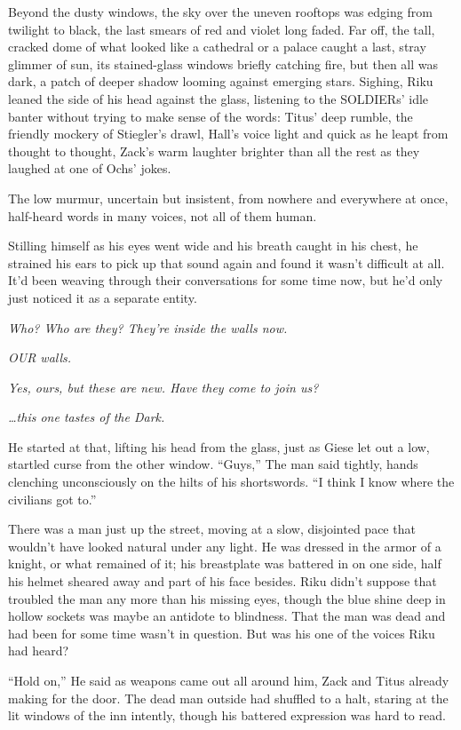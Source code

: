 Beyond the dusty windows, the sky over the uneven rooftops was edging from twilight to black, the last smears of red and violet long faded. Far off, the tall, cracked dome of what looked like a cathedral or a palace caught a last, stray glimmer of sun, its stained-glass windows briefly catching fire, but then all was dark, a patch of deeper shadow looming against emerging stars. Sighing, Riku leaned the side of his head against the glass, listening to the SOLDIERs' idle banter without trying to make sense of the words: Titus' deep rumble, the friendly mockery of Stiegler's drawl, Hall's voice light and quick as he leapt from thought to thought, Zack's warm laughter brighter than all the rest as they laughed at one of Ochs' jokes.

The low murmur, uncertain but insistent, from nowhere and everywhere at once, half-heard words in many voices, not all of them human.

Stilling himself as his eyes went wide and his breath caught in his chest, he strained his ears to pick up that sound again and found it wasn't difficult at all. It'd been weaving through their conversations for some time now, but he'd only just noticed it as a separate entity.

\emph{Who? Who are they? \textemdash They're inside the walls now.}

\emph{\textemdash OUR walls.}

\emph{Yes, ours, but these are new. Have they come to join us?}

\emph{\ldots this one tastes of the Dark.}

He started at that, lifting his head from the glass, just as Giese let out a low, startled curse from the other window. ``Guys,'' The man said tightly, hands clenching unconsciously on the hilts of his shortswords. ``I think I know where the civilians got to.''

There was a man just up the street, moving at a slow, disjointed pace that wouldn't have looked natural under any light. He was dressed in the armor of a knight, or what remained of it; his breastplate was battered in on one side, half his helmet sheared away and part of his face besides. Riku didn't suppose that troubled the man any more than his missing eyes, though the blue shine deep in hollow sockets was maybe an antidote to blindness. That the man was dead and had been for some time wasn't in question. But was his one of the voices Riku had heard?

``Hold on,'' He said as weapons came out all around him, Zack and Titus already making for the door. The dead man outside had shuffled to a halt, staring at the lit windows of the inn intently, though his battered expression was hard to read.

